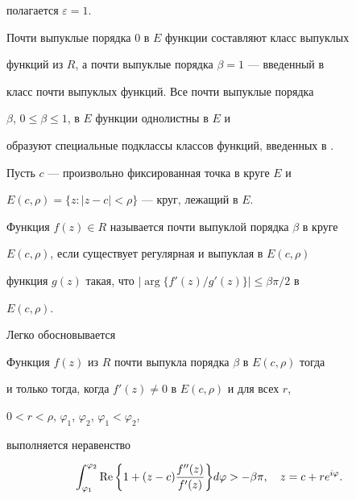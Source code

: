 полагается $\varepsilon=1$. 


 


Почти выпуклые порядка 0 в $E$ функции составляют класс выпуклых 


функций из $R$, а почти выпуклые порядка $\beta=1$ --- введенный в 


\cite{3} класс почти выпуклых функций. Все почти выпуклые порядка 


$\beta$, $0\le\beta\le1$, в $E$ функции однолистны в $E$ \cite{3} и 


образуют специальные подклассы классов функций, введенных в \cite{4}. 


 


Пусть $c$ --- произвольно фиксированная точка в круге $E$ и 


$E(c,\rho)=\{z:|z-c|<\rho\}$ --- круг, лежащий в $E$. 


 


\begin{defnnonum} 


Функция $f(z)\in R$ называется почти выпуклой порядка $\beta$ в круге 


$E(c,\rho)$, если существует регулярная и выпуклая в $E(c,\rho)$ 


функция $g(z)$ такая, что $|\arg\{f'(z)/g'(z)\}|\le\beta\pi/2$ в 


$E(c,\rho)$. 


\end{defnnonum} 


 


Легко обосновывается 


 


\begin{lemnonum} 


Функция $f(z)$ из $R$ почти выпукла порядка $\beta$ в $E(c,\rho)$ тогда 


и только тогда, когда $f'(z)\ne0$ в $E(c,\rho)$ и для всех $r$, 


$0<r<\rho$, $\varphi_1$, $\varphi_2$, $\varphi_1<\varphi_2$, 


выполняется неравенство 


\begin{equation} 


\int^{\varphi_2}_{\varphi_1}\re\bigg\{1+(z-c) 


\frac{f''(z)}{f'(z)}\bigg\}d\varphi>-\beta\pi,\quad 


z=c+r e^{i\varphi}. 


\end{equation} 


\end{lemnonum} 





